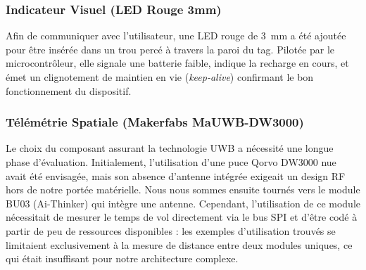 
\subsubsection{Indicateur Visuel (LED Rouge 3mm)}
Afin de communiquer avec l'utilisateur, une LED rouge de 3~mm a été ajoutée pour être insérée dans un trou percé à travers la paroi du tag. Pilotée par le microcontrôleur, elle signale une batterie faible, indique la recharge en cours, et émet un clignotement de maintien en vie (\textit{keep-alive}) confirmant le bon fonctionnement du dispositif.

\subsubsection{Télémétrie Spatiale (Makerfabs MaUWB-DW3000)}

Le choix du composant assurant la technologie UWB a nécessité une longue phase d'évaluation. Initialement, l'utilisation d'une puce Qorvo DW3000 nue avait été envisagée, mais son absence d'antenne intégrée exigeait un design RF hors de notre portée matérielle. Nous nous sommes ensuite tournés vers le module BU03 (Ai-Thinker) qui intègre une antenne. Cependant, l'utilisation de ce module nécessitait de mesurer le temps de vol directement via le bus SPI et d'être codé à partir de peu de ressources disponibles : les exemples d'utilisation trouvés se limitaient exclusivement à la mesure de distance entre deux modules uniques, ce qui était insuffisant pour notre architecture complexe.

